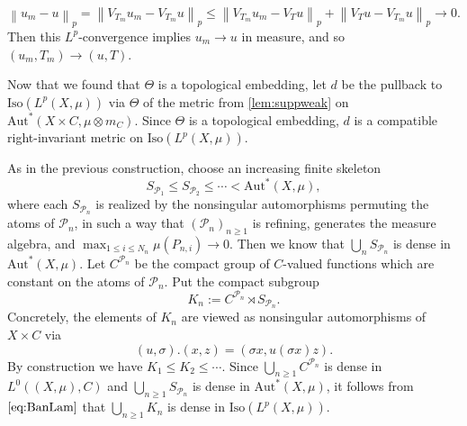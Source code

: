 \documentclass{amsart}
\numberwithin{equation}{subsection}
\theoremstyle{plain}
\theoremstyle{definition}
\theoremstyle{plain}
\begin{document}
\[\left\|u_{m}-u\right\|_{p}=\left\|V_{T_{m}}u_{m}-V_{T_{m}}u\right\|_{p}\leq\left\|V_{T_{m}}u_{m}-V_{T}u\right\|_{p}+\left\|V_{T}u-V_{T_{m}}u\right\|_{p}\to0.\]
Then this \(L^{p}\)-convergence implies \(u_{m}\to u\) in measure, and so \(\left(u_{m},T_{m}\right)\to\left(u,T\right)\).

\smallskip

Now that we found that \(\Theta\) is a topological embedding, let \(d\) be the pullback to \(\mathrm{Iso}\left(L^{p}\left(X,\mu\right)\right)\) via \(\Theta\) of the metric from \cref{lem:suppweak} on \(\mathrm{Aut}^{\ast}\left(X\times C,\mu\otimes m_{C}\right)\). Since \(\Theta\) is a topological embedding, \(d\) is a compatible right-invariant metric on \(\mathrm{Iso}\left(L^{p}\left(X,\mu\right)\right)\).

\smallskip

As in the previous construction, choose an
increasing finite skeleton
\[S_{\mathcal{P}_{1}}\leq S_{\mathcal{P}_{2}}\leq\dotsm<\mathrm{Aut}^{\ast}\left(X,\mu\right),\]
where each \(S_{\mathcal{P}_{n}}\) is realized by the nonsingular automorphisms permuting the atoms of \(\mathcal{P}_{n}\), in such a way that \(\left(\mathcal{P}_{n}\right)_{n\geq 1}\) is refining, generates the measure algebra, and \(\max_{1\leq i\leq N_{n}}\mu\left(P_{n,i}\right)\to0\). Then we know that \(\bigcup_{n}S_{\mathcal{P}_{n}}\) is dense in \(\mathrm{Aut}^{\ast}\left(X,\mu\right)\). Let \(C^{\mathcal{P}_{n}}\) be the compact group of \(C\)-valued functions which are constant on the atoms of \(\mathcal{P}_{n}\). Put the compact subgroup
\[K_{n}:=C^{\mathcal{P}_{n}}\rtimes S_{\mathcal{P}_{n}}.\]
Concretely, the elements of \(K_{n}\) are viewed as nonsingular automorphisms of  \(X\times C\) via
\[\left(u,\sigma\right).\left(x,z\right)=\left(\sigma x,u\left(\sigma x\right)z\right).\]
By construction we have \(K_{1}\leq K_{2}\leq\dotsm\). Since \(\bigcup_{n\geq1}C^{\mathcal{P}_{n}}\) is dense in \(L^{0}\left(\left(X,\mu\right),C\right)\) and \(\bigcup_{n\geq1}S_{\mathcal{P}_{n}}\) is dense in \(\mathrm{Aut}^{\ast}\left(X,\mu\right)\), it follows from \(\eqref{eq:BanLam}\) that \(\bigcup_{n\geq1}K_{n}\) is dense in \(\mathrm{Iso}\left(L^{p}\left(X,\mu\right)\right)\).

\smallskip
\end{document}
